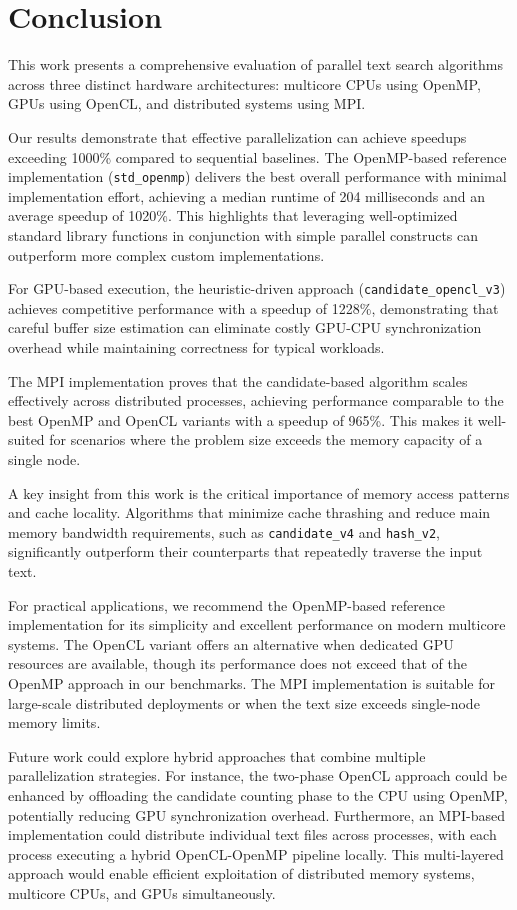 \documentclass{article}
\begin{document}
    \section{Conclusion}
    This work presents a comprehensive evaluation of parallel text search algorithms across three distinct hardware architectures: multicore CPUs using OpenMP, GPUs using OpenCL, and distributed systems using MPI\@.

    Our results demonstrate that effective parallelization can achieve speedups exceeding 1000\% compared to sequential baselines.
    The OpenMP-based reference implementation (\texttt{std\_openmp}) delivers the best overall performance with minimal implementation effort, achieving a median runtime of 204 milliseconds and an average speedup of 1020\%.
    This highlights that leveraging well-optimized standard library functions in conjunction with simple parallel constructs can outperform more complex custom implementations.

    For GPU-based execution, the heuristic-driven approach (\texttt{candidate\_opencl\_v3}) achieves competitive performance with a speedup of 1228\%, demonstrating that careful buffer size estimation can eliminate costly GPU-CPU synchronization overhead while maintaining correctness for typical workloads.

    The MPI implementation proves that the candidate-based algorithm scales effectively across distributed processes, achieving performance comparable to the best OpenMP and OpenCL variants with a speedup of 965\%.
    This makes it well-suited for scenarios where the problem size exceeds the memory capacity of a single node.

    A key insight from this work is the critical importance of memory access patterns and cache locality.
    Algorithms that minimize cache thrashing and reduce main memory bandwidth requirements, such as \texttt{candidate\_v4} and \texttt{hash\_v2}, significantly outperform their counterparts that repeatedly traverse the input text.

    For practical applications, we recommend the OpenMP-based reference implementation for its simplicity and excellent performance on modern multicore systems.
    The OpenCL variant offers an alternative when dedicated GPU resources are available, though its performance does not exceed that of the OpenMP approach in our benchmarks.
    The MPI implementation is suitable for large-scale distributed deployments or when the text size exceeds single-node memory limits.

    Future work could explore hybrid approaches that combine multiple parallelization strategies.
    For instance, the two-phase OpenCL approach could be enhanced by offloading the candidate counting phase to the CPU using OpenMP, potentially reducing GPU synchronization overhead.
    Furthermore, an MPI-based implementation could distribute individual text files across processes, with each process executing a hybrid OpenCL-OpenMP pipeline locally.
    This multi-layered approach would enable efficient exploitation of distributed memory systems, multicore CPUs, and GPUs simultaneously.

    \printbibliography
\end{document}
